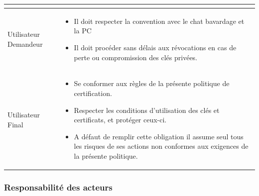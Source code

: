 \documentclass[a4paper,11pt,french]{article}
\begin{document}
\begin{tabular}{|l|p{10cm}|}
\begin{itemize}
  \end{itemize}
 \\
 \hline
 Utilisateur Demandeur &
 \begin{itemize}
 \item Il doit respecter la convention avec le chat bavardage et la PC
\item Il doit procéder sans délais aux révocations en cas de perte ou
compromission des clés privées. 
 
 \end{itemize} 
  
 \\
 \hline
 Utilisateur Final &
 \begin{itemize}
 \item Se conformer aux règles de la présente politique de certification.
\item Respecter les conditions d'utilisation des clés et certificats, et protéger ceux-ci.
\item A défaut de remplir cette obligation il assume seul tous les risques de ses actions non conformes aux exigences de la présente politique.
 
 \end{itemize}
\\
\hline
  
\end{tabular}
\subsubsection{Responsabilité des acteurs}
\end{document}
